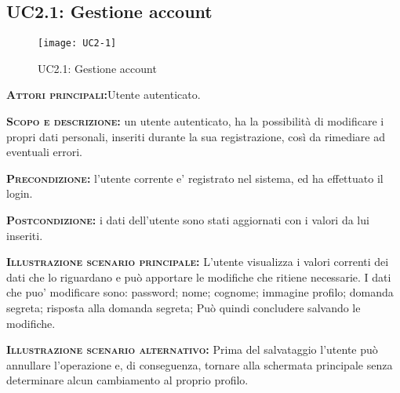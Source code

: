 \subsection{UC2.1: Gestione account}
\begin{figure}[h!]
\centering
\texttt{[image: UC2-1]}
\caption{UC2.1: Gestione account}\label{UC2.1}
\end{figure}
\begin{description}
\item{\scshape\bfseries Attori principali:}Utente autenticato.
\item{\scshape\bfseries Scopo e descrizione:} un utente autenticato, ha la possibilità di modificare i propri dati personali, inseriti durante la sua registrazione, così da rimediare ad eventuali errori.
\item{\scshape\bfseries Precondizione:} l'utente corrente e' registrato nel sistema, ed ha effettuato il login.
\item{\scshape\bfseries Postcondizione:} i dati dell'utente sono stati aggiornati con i valori da lui inseriti.
\item{\scshape\bfseries Illustrazione scenario principale:} L'utente visualizza i valori correnti dei dati che lo riguardano e può apportare
le modifiche che ritiene necessarie. I dati che puo' modificare sono:
password;
nome;
cognome;
immagine profilo;
domanda segreta;
risposta alla domanda segreta;
Può quindi concludere salvando le modifiche.
\item{\scshape\bfseries Illustrazione scenario alternativo:} Prima del salvataggio l'utente può annullare l'operazione e, di conseguenza,
tornare alla schermata principale senza determinare alcun cambiamento al proprio
profilo.
\end{description}

